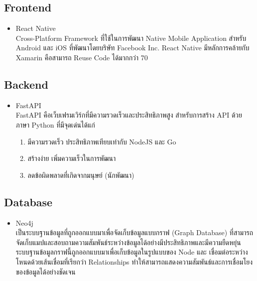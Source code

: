 \documentclass[14pt,oneside,openright,a4paper]{cpe-thai-project}
\begin{document}
  \subsection{Frontend}
    \begin{itemize}
      \item React Native \cite{ReactNative} \\ 
        Cross-Platform Framework ที่ใช้ในการพัฒนา Native Mobile Application สำหรับ Android และ iOS ที่พัฒนาโดยบริษัท Facebook Inc. 
        React Native มีหลักการคล้ายกับ Xamarin คือสามารถ Reuse Code ได้มากกว่า 70%
    \end{itemize}

  \subsection{Backend}
    \begin{itemize}
      \item FastAPI \cite{FastAPI} \\ 
        FastAPI คือเว็บเฟรมเวิร์กที่มีความรวดเร็วและประสิทธิภาพสูง สำหรับการสร้าง API ด้วยภาษา Python ที่มีจุดเด่นได้แก่
        \begin{enumerate}
          \item มีความรวดเร็ว ประสิทธิภาพเทียบเท่ากับ NodeJS และ Go 
          \item สร้างง่าย เพิ่มความเร็วในการพัฒนา
          \item ลดข้อผิดพลาดที่เกิดจากมนุษย์ (นักพัฒนา)
        \end{enumerate}
    \end{itemize}

  \subsection{Database}
    \begin{itemize}
      \item Neo4j \cite{Neo4j} \\ 
        เป็นระบบฐานข้อมูลที่ถูกออกแบบมาเพื่อจัดเก็บข้อมูลแบบกราฟ (Graph Database) ที่สามารถจัดเก็บแมปและสอบถามความสัมพันธ์ระหว่างข้อมูลได้อย่างมีประสิทธิภาพและมีความยืดหยุ่น ระบบฐานข้อมูลกราฟนี้ถูกออกแบบมาเพื่อเก็บข้อมูลในรูปแบบของ Node และ เชื่อมต่อระหว่างโหนดด้วยเส้นเชื่อมที่เรียกว่า Relationships ทำให้สามารถแสดงความสัมพันธ์และการเชื่อมโยงของข้อมูลได้อย่างชัดเจน
    \end{itemize}
\end{document}
